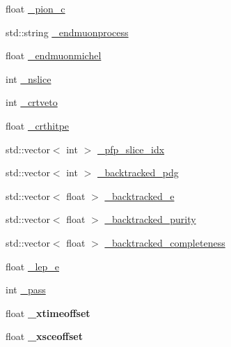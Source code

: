 \begin{DoxyCompactItemize}
\item 
float \hyperlink{classanalysis_1_1DefaultAnalysis_a9978effbcfba62536fc88a73fa985fe9}{\-\_\-pion\-\_\-c}
\item 
std\-::string \hyperlink{classanalysis_1_1DefaultAnalysis_a8cbb24a231e167258d2914f92bc4af22}{\-\_\-endmuonprocess}
\item 
float \hyperlink{classanalysis_1_1DefaultAnalysis_a3797bcb310074825add03ce03175fdc3}{\-\_\-endmuonmichel}
\item 
int \hyperlink{classanalysis_1_1DefaultAnalysis_a3eddf49910782afed7f324755fffe681}{\-\_\-nslice}
\item 
int \hyperlink{classanalysis_1_1DefaultAnalysis_a84ce9904fa527012a65c2be203a38d38}{\-\_\-crtveto}
\item 
float \hyperlink{classanalysis_1_1DefaultAnalysis_a900ec35e3ca4a00d4625a1e632bb6b40}{\-\_\-crthitpe}
\item 
std\-::vector$<$ int $>$ \hyperlink{classanalysis_1_1DefaultAnalysis_acbf0c279993cbefca72f38bc5e9f6627}{\-\_\-pfp\-\_\-slice\-\_\-idx}
\item 
std\-::vector$<$ int $>$ \hyperlink{classanalysis_1_1DefaultAnalysis_a28bd59dce75b8fd3be70bd4996354ae9}{\-\_\-backtracked\-\_\-pdg}
\item 
std\-::vector$<$ float $>$ \hyperlink{classanalysis_1_1DefaultAnalysis_a2c16b4988d0bccf8b7ef96a52c173b80}{\-\_\-backtracked\-\_\-e}
\item 
std\-::vector$<$ float $>$ \hyperlink{classanalysis_1_1DefaultAnalysis_ad08d9b30c434685e350c5f292d4df08b}{\-\_\-backtracked\-\_\-purity}
\item 
std\-::vector$<$ float $>$ \hyperlink{classanalysis_1_1DefaultAnalysis_a60ef3ec6e332c118c088e0203fb858d6}{\-\_\-backtracked\-\_\-completeness}
\item 
float \hyperlink{classanalysis_1_1DefaultAnalysis_ab00e533228597e83340a23d04b986086}{\-\_\-lep\-\_\-e}
\item 
int \hyperlink{classanalysis_1_1DefaultAnalysis_a8d58d05d4b0750a67babff41beece3ac}{\-\_\-pass}
\item 
\hypertarget{classanalysis_1_1DefaultAnalysis_a6ab8489552ea4bfceb0301df80100c65}{float {\bfseries \-\_\-xtimeoffset}}\label{classanalysis_1_1DefaultAnalysis_a6ab8489552ea4bfceb0301df80100c65}

\item 
\hypertarget{classanalysis_1_1DefaultAnalysis_a31b53194403f7db533cd349a0f85a62c}{float {\bfseries \-\_\-xsceoffset}}\label{classanalysis_1_1DefaultAnalysis_a31b53194403f7db533cd349a0f85a62c}


\end{DoxyCompactItemize}
